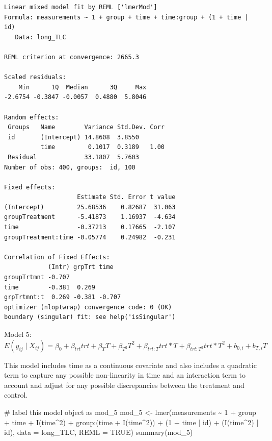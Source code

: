 \documentclass[
  letterpaper,
  DIV=11,
  numbers=noendperiod]{scrreprt}
\newenvironment{Shaded}{\begin{snugshade}}{\end{snugshade}}
\newcommand{\AttributeTok}[1]{\textcolor[rgb]{0.40,0.45,0.13}{#1}}
\newcommand{\CommentTok}[1]{\textcolor[rgb]{0.37,0.37,0.37}{#1}}
\newcommand{\ConstantTok}[1]{\textcolor[rgb]{0.56,0.35,0.01}{#1}}
\newcommand{\DecValTok}[1]{\textcolor[rgb]{0.68,0.00,0.00}{#1}}
\newcommand{\FunctionTok}[1]{\textcolor[rgb]{0.28,0.35,0.67}{#1}}
\newcommand{\NormalTok}[1]{\textcolor[rgb]{0.00,0.23,0.31}{#1}}
\newcommand{\OtherTok}[1]{\textcolor[rgb]{0.00,0.23,0.31}{#1}}
\newcommand{\SpecialCharTok}[1]{\textcolor[rgb]{0.37,0.37,0.37}{#1}}
\begin{document}
\begin{verbatim}
Linear mixed model fit by REML ['lmerMod']
Formula: measurements ~ 1 + group + time + time:group + (1 + time | id)
   Data: long_TLC

REML criterion at convergence: 2665.3

Scaled residuals: 
    Min      1Q  Median      3Q     Max 
-2.6754 -0.3847 -0.0057  0.4880  5.8046 

Random effects:
 Groups   Name        Variance Std.Dev. Corr
 id       (Intercept) 14.8608  3.8550       
          time         0.1017  0.3189   1.00
 Residual             33.1807  5.7603       
Number of obs: 400, groups:  id, 100

Fixed effects:
                    Estimate Std. Error t value
(Intercept)         25.68536    0.82687  31.063
groupTreatment      -5.41873    1.16937  -4.634
time                -0.37213    0.17665  -2.107
groupTreatment:time -0.05774    0.24982  -0.231

Correlation of Fixed Effects:
            (Intr) grpTrt time  
groupTrtmnt -0.707              
time        -0.381  0.269       
grpTrtmnt:t  0.269 -0.381 -0.707
optimizer (nloptwrap) convergence code: 0 (OK)
boundary (singular) fit: see help('isSingular')
\end{verbatim}

\begin{center}
Model 5: $E(y_{ij} \mid X_{ij}) = \beta_0 + \beta_{trt}trt + \beta_{T}T + \beta_{T^2}T^2 + \beta_{trt:T}trt*T+\beta_{trt:T^2}trt*T^2+b_{0,i} + b_{T,i}T$
\end{center}

This model includes time as a continuous covariate and also includes a
quadratic term to capture any possible non-linearity in time and an
interaction term to account and adjust for any possible discrepancies
between the treatment and control.

\begin{Shaded}
\begin{Highlighting}[]
\CommentTok{\# label this model object as mod\_5}
\NormalTok{mod\_5 }\OtherTok{\textless{}{-}} \FunctionTok{lmer}\NormalTok{(measurements }\SpecialCharTok{\textasciitilde{}} \DecValTok{1} \SpecialCharTok{+}\NormalTok{ group }\SpecialCharTok{+}\NormalTok{ time }\SpecialCharTok{+} \FunctionTok{I}\NormalTok{(time}\SpecialCharTok{\^{}}\DecValTok{2}\NormalTok{) }\SpecialCharTok{+}\NormalTok{ group}\SpecialCharTok{:}\NormalTok{(time }\SpecialCharTok{+} \FunctionTok{I}\NormalTok{(time}\SpecialCharTok{\^{}}\DecValTok{2}\NormalTok{)) }\SpecialCharTok{+}
\NormalTok{    (}\DecValTok{1} \SpecialCharTok{+}\NormalTok{ time }\SpecialCharTok{|}\NormalTok{ id) }\SpecialCharTok{+}\NormalTok{ (}\FunctionTok{I}\NormalTok{(time}\SpecialCharTok{\^{}}\DecValTok{2}\NormalTok{) }\SpecialCharTok{|}\NormalTok{ id), }\AttributeTok{data =}\NormalTok{ long\_TLC, }\AttributeTok{REML =} \ConstantTok{TRUE}\NormalTok{)}
\FunctionTok{summary}\NormalTok{(mod\_5)}
\end{Highlighting}
\end{Shaded}
\end{document}
